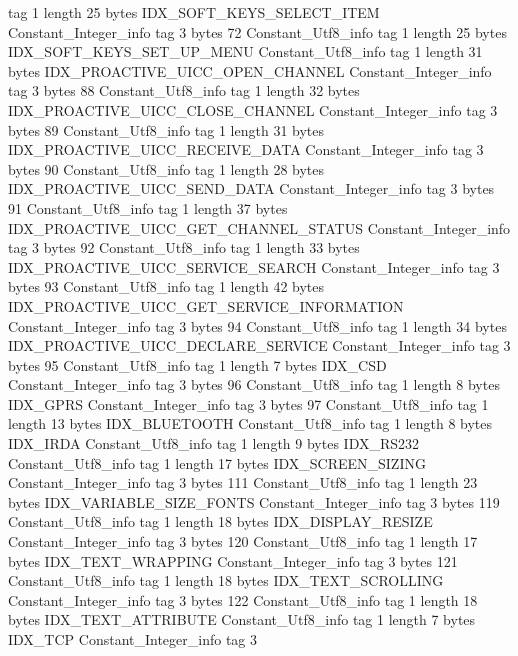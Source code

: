 {{{			tag	1
			length	25
			bytes	IDX_SOFT_KEYS_SELECT_ITEM
		}
		Constant_Integer_info {
			tag	3
			bytes	72
		}
		Constant_Utf8_info {
			tag	1
			length	25
			bytes	IDX_SOFT_KEYS_SET_UP_MENU
		}
		Constant_Utf8_info {
			tag	1
			length	31
			bytes	IDX_PROACTIVE_UICC_OPEN_CHANNEL
		}
		Constant_Integer_info {
			tag	3
			bytes	88
		}
		Constant_Utf8_info {
			tag	1
			length	32
			bytes	IDX_PROACTIVE_UICC_CLOSE_CHANNEL
		}
		Constant_Integer_info {
			tag	3
			bytes	89
		}
		Constant_Utf8_info {
			tag	1
			length	31
			bytes	IDX_PROACTIVE_UICC_RECEIVE_DATA
		}
		Constant_Integer_info {
			tag	3
			bytes	90
		}
		Constant_Utf8_info {
			tag	1
			length	28
			bytes	IDX_PROACTIVE_UICC_SEND_DATA
		}
		Constant_Integer_info {
			tag	3
			bytes	91
		}
		Constant_Utf8_info {
			tag	1
			length	37
			bytes	IDX_PROACTIVE_UICC_GET_CHANNEL_STATUS
		}
		Constant_Integer_info {
			tag	3
			bytes	92
		}
		Constant_Utf8_info {
			tag	1
			length	33
			bytes	IDX_PROACTIVE_UICC_SERVICE_SEARCH
		}
		Constant_Integer_info {
			tag	3
			bytes	93
		}
		Constant_Utf8_info {
			tag	1
			length	42
			bytes	IDX_PROACTIVE_UICC_GET_SERVICE_INFORMATION
		}
		Constant_Integer_info {
			tag	3
			bytes	94
		}
		Constant_Utf8_info {
			tag	1
			length	34
			bytes	IDX_PROACTIVE_UICC_DECLARE_SERVICE
		}
		Constant_Integer_info {
			tag	3
			bytes	95
		}
		Constant_Utf8_info {
			tag	1
			length	7
			bytes	IDX_CSD
		}
		Constant_Integer_info {
			tag	3
			bytes	96
		}
		Constant_Utf8_info {
			tag	1
			length	8
			bytes	IDX_GPRS
		}
		Constant_Integer_info {
			tag	3
			bytes	97
		}
		Constant_Utf8_info {
			tag	1
			length	13
			bytes	IDX_BLUETOOTH
		}
		Constant_Utf8_info {
			tag	1
			length	8
			bytes	IDX_IRDA
		}
		Constant_Utf8_info {
			tag	1
			length	9
			bytes	IDX_RS232
		}
		Constant_Utf8_info {
			tag	1
			length	17
			bytes	IDX_SCREEN_SIZING
		}
		Constant_Integer_info {
			tag	3
			bytes	111
		}
		Constant_Utf8_info {
			tag	1
			length	23
			bytes	IDX_VARIABLE_SIZE_FONTS
		}
		Constant_Integer_info {
			tag	3
			bytes	119
		}
		Constant_Utf8_info {
			tag	1
			length	18
			bytes	IDX_DISPLAY_RESIZE
		}
		Constant_Integer_info {
			tag	3
			bytes	120
		}
		Constant_Utf8_info {
			tag	1
			length	17
			bytes	IDX_TEXT_WRAPPING
		}
		Constant_Integer_info {
			tag	3
			bytes	121
		}
		Constant_Utf8_info {
			tag	1
			length	18
			bytes	IDX_TEXT_SCROLLING
		}
		Constant_Integer_info {
			tag	3
			bytes	122
		}
		Constant_Utf8_info {
			tag	1
			length	18
			bytes	IDX_TEXT_ATTRIBUTE
		}
		Constant_Utf8_info {
			tag	1
			length	7
			bytes	IDX_TCP
		}
		Constant_Integer_info {
			tag	3
}}}
